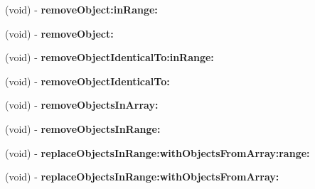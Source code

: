 \begin{DoxyCompactItemize}
\item 
\hypertarget{interfaceget_prepared_medications_for_patient_response_ac63f06627fe90befc25e8e755ec42254}{}(void) -\/ {\bfseries remove\+Object\+:in\+Range\+:}\label{interfaceget_prepared_medications_for_patient_response_ac63f06627fe90befc25e8e755ec42254}

\item 
\hypertarget{interfaceget_prepared_medications_for_patient_response_a7982fa6df24bfe312f071b4735fa842e}{}(void) -\/ {\bfseries remove\+Object\+:}\label{interfaceget_prepared_medications_for_patient_response_a7982fa6df24bfe312f071b4735fa842e}

\item 
\hypertarget{interfaceget_prepared_medications_for_patient_response_a8f2c16c947bc0ff0b7b20d1c5cc81f5d}{}(void) -\/ {\bfseries remove\+Object\+Identical\+To\+:in\+Range\+:}\label{interfaceget_prepared_medications_for_patient_response_a8f2c16c947bc0ff0b7b20d1c5cc81f5d}

\item 
\hypertarget{interfaceget_prepared_medications_for_patient_response_a35ca4a3a0625e470a484a436ed012315}{}(void) -\/ {\bfseries remove\+Object\+Identical\+To\+:}\label{interfaceget_prepared_medications_for_patient_response_a35ca4a3a0625e470a484a436ed012315}

\item 
\hypertarget{interfaceget_prepared_medications_for_patient_response_a748aed0fd9bc087952b14e1ce822f283}{}(void) -\/ {\bfseries remove\+Objects\+In\+Array\+:}\label{interfaceget_prepared_medications_for_patient_response_a748aed0fd9bc087952b14e1ce822f283}

\item 
\hypertarget{interfaceget_prepared_medications_for_patient_response_a13152a6da649d9aba75aa7c47618b508}{}(void) -\/ {\bfseries remove\+Objects\+In\+Range\+:}\label{interfaceget_prepared_medications_for_patient_response_a13152a6da649d9aba75aa7c47618b508}

\item 
\hypertarget{interfaceget_prepared_medications_for_patient_response_ab59a5aedb981b07b5eede75ed3d927ee}{}(void) -\/ {\bfseries replace\+Objects\+In\+Range\+:with\+Objects\+From\+Array\+:range\+:}\label{interfaceget_prepared_medications_for_patient_response_ab59a5aedb981b07b5eede75ed3d927ee}

\item 
\hypertarget{interfaceget_prepared_medications_for_patient_response_a06cb8d5c062e66a7577ecb31b184545c}{}(void) -\/ {\bfseries replace\+Objects\+In\+Range\+:with\+Objects\+From\+Array\+:}\label{interfaceget_prepared_medications_for_patient_response_a06cb8d5c062e66a7577ecb31b184545c}


\end{DoxyCompactItemize}
